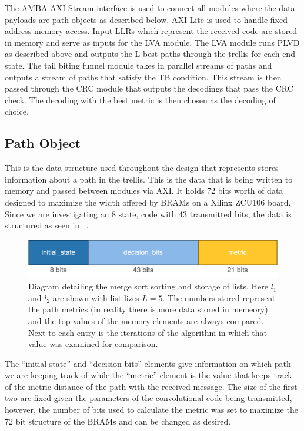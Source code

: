 The AMBA-AXI Stream interface is used to connect all modules where the data payloads are path objects as described below. AXI-Lite is used to handle fixed address memory access. 
Input LLRs which represent the received code are stored in memory and serve as inputs for the LVA module. The LVA module runs PLVD as described above and outputs the L best paths through the trellis for each end state. The tail biting funnel module takes in parallel streams of paths and outputs a stream of paths that satisfy the TB condition. This stream is then passed through the CRC module that outputs the decodings that pass the CRC check. The decoding with the best metric is then chosen as the decoding of choice.

\subsection{Path Object}
This is the data structure used throughout the design that represents stores information about a path in the trellis. This is the data that is being written to memory and passed between modules via AXI. It holds 72 bits worth of data designed to maximize the width offered by BRAMs on a Xilinx ZCU106 board. Since we are investigating an 8 state, code with 43 transmitted bits, the data is structured as seen in \Figure~.

\begin{figure}
\centering\CaptionFontSize
\includegraphics[width=\textwidth]
{Figures/path_object.png}
\caption[Diagram detailing the merge sort sorting and storage of lists]
{Diagram detailing the merge sort sorting and storage of lists. Here $l_1$ and $l_2$ are shown with list lizes $L=5$. The numbers stored represent the path metrics (in reality there is more data stored in memeory) and the top values of the memory elements are always compared. Next to each entry is the iterations of the algorithm in which that value was examined for comparison.}
\label{Figure:DecoderHW:PathObject}
\end{figure}

The “initial state” and “decision bits” elements give information on which path we are keeping track of while the “metric” element is the value that keeps track of the metric distance of the path with the received message. The size of the first two are fixed given the parameters of the convolutional code being transmitted, however, the number of bits used to calculate the metric was set to maximize the 72 bit structure of the BRAMs and can be changed as desired.


